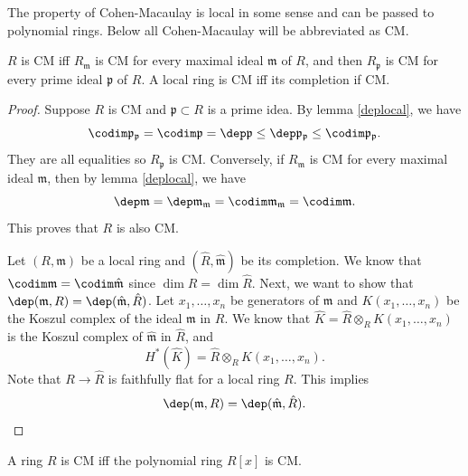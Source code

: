 The property of Cohen-Macaulay is local in some sense and can be passed to polynomial rings. Below all Cohen-Macaulay will be abbreviated as CM.

\begin{proposition}\label{CMlocal}
     \(R\) is CM iff \(R_\mathfrak{m}\) is CM for every maximal ideal \(\mathfrak{m}\) of \(R\), and then \(R_\mathfrak{p}\) is CM for every prime ideal \(\mathfrak{p}\) of \(R\). A local ring is CM iff its completion if CM.
\end{proposition}

\begin{proof}
    Suppose \(R\) is CM and \(\mathfrak{p}\subset R\) is a prime idea. By lemma \ref{deplocal}, we have 
    \[\codim \mathfrak{p}_\mathfrak{p}=\codim \mathfrak{p}=\dep \mathfrak{p}\leq \dep \mathfrak{p}_\mathfrak{p}\leq \codim \mathfrak{p}_\mathfrak{p}.\]
    They are all equalities so \(R_\mathfrak{p}\) is CM. Conversely, if \(R_\mathfrak{m}\) is CM for every maximal ideal \(\mathfrak{m}\), then by lemma \ref{deplocal}, we have 
    \[\dep \mathfrak{m}=\dep \mathfrak{m}_\mathfrak{m}=\codim \mathfrak{m}_\mathfrak{m}=\codim \mathfrak{m}.\]
    This proves that \(R\) is also CM.

    Let \((R,\mathfrak{m})\) be a local ring and \((\hat{R},\hat{\mathfrak{m}})\) be its completion. We know that \(\codim \mathfrak{m}=\codim \hat{\mathfrak{m}}\) since \(\dim R=\dim \hat{R}\). Next, we want to show that \(\dep (\mathfrak{m},R)=\dep (\hat{\mathfrak{m}}, \hat{R})\). Let \(x_1,\ldots,x_n\) be generators of \(\mathfrak{m}\) and \(K(x_1,\ldots,x_n)\) be the Koszul complex of the ideal \(\mathfrak{m}\) in \(R\). We know that \(\hat{K}=\hat{R}\otimes_R K(x_1,\ldots,x_n)\) is the Koszul complex of \(\hat{\mathfrak{m}}\) in \(\hat{R}\), and 
    \[H^*(\hat{K})=\hat{R}\otimes_R K(x_1,\ldots,x_n).\]
    Note that \(R\rightarrow \hat{R}\) is faithfully flat for a local ring \(R\). This implies 
    \[\dep (\mathfrak{m},R)=\dep (\hat{\mathfrak{m}}, \hat{R}).\]
\end{proof}

\begin{proposition}\label{CMpoly}
     A ring \(R\) is CM iff the polynomial ring \(R[x]\) is CM.
\end{proposition}

